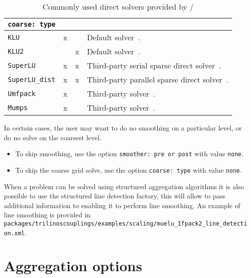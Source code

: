 \begin{table}[tbh]
  \begin{center}
    \begin{tabular}{p{4.0cm} c c p{7cm}}
      \toprule
      \texttt{coarse: type}             & \amesos{} & \amesostwo{} &  \\
      \midrule
      \verb|KLU|                        & x & & Default \amesos{} solver~\cite{klu}. \\
      \verb|KLU2|                       & & x & Default \amesostwo{} solver~\cite{amesos2_belos}. \\
      \verb|SuperLU|                    & x & x & Third-party serial sparse direct solver~\cite{Li2011}. \\
      \verb|SuperLU_dist|               & x & x & Third-party parallel sparse direct solver~\cite{Li2011}. \\
      \verb|Umfpack|                    & x & & Third-party solver~\cite{umfpack}. \\
      \verb|Mumps|                      & x & & Third-party solver~\cite{mumps}. \\
      \bottomrule
    \end{tabular}
    \caption{Commonly used direct solvers provided by \amesos{}/\amesostwo{}}
\label{tab:coarse_solvers}
  \end{center}
\end{table}

In certain cases, the user may want to do no smoothing on a particular level, or do no solve on the coarsest level.
\begin{itemize}
  \item To skip smoothing, use the option \verb!smoother: pre or post! with value \verb!none!.
  \item To skip the coarse grid solve, use the option \verb!coarse: type! with value \verb!none!.
\end{itemize}

When a problem can be solved using structured aggregation algorithms it is also possible to use the structured line detection factory,
 this will allow \muelu{} to pass additional information to  enabling it to perform line smoothing.
An example of line smoothing is provided in \texttt{packages/trilinoscouplings/examples/scaling/muelu\_Ifpack2\_line\_detection.xml}.



\section{Aggregation options}
\label{sec:options_aggregation}

